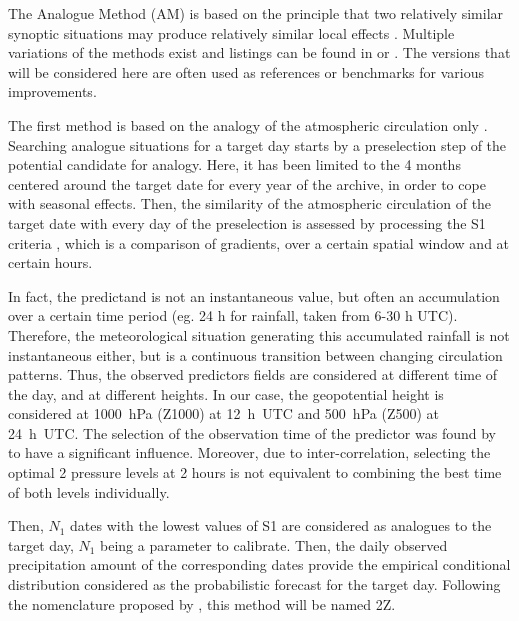 \documentclass[hess]{copernicus}
\begin{document}
\introduction  %

The Analogue Method (AM) is based on the principle that two relatively similar synoptic situations may produce relatively similar local effects \citep{Lorenz1956, Lorenz1969}. Multiple variations of the methods exist and listings can be found in \citet{Horton2016} or \citet{BenDaoud2015}. The versions that will be considered here are often used as references or benchmarks for various improvements.

The first method is based on the analogy of the atmospheric circulation only \citep[Table \ref{table:method_2Z},][]{Obled2002, Bontron2005, Marty2012}. Searching analogue situations for a target day starts by a preselection step of the potential candidate for analogy. Here, it has been limited to the 4 months centered around the target date for every year of the archive, in order to cope with seasonal effects. Then, the similarity of the atmospheric circulation of the target date with every day of the preselection is assessed by processing the S1 criteria \citep[Eq.\ \ref{eq:S1}, ][]{Teweles1954, Drosdowsky2003}, which is a comparison of gradients, over a certain spatial window and at certain hours.

In fact, the predictand is not an instantaneous value, but often an accumulation over a certain time period (eg. 24 h for rainfall, taken from 6-30 h UTC). Therefore, the meteorological situation generating this accumulated rainfall is not instantaneous either, but is a continuous transition between changing circulation patterns. Thus, the observed predictors fields are considered at different time of the day, and at different heights. In our case, the geopotential height is considered at 1000~hPa (Z1000) at 12~h~UTC and 500~hPa (Z500) at 24~h~UTC. The selection of the observation time of the predictor was found by \citet{Bontron2004} to have a significant influence. Moreover, due to inter-correlation, selecting the optimal 2 pressure levels at 2 hours is not equivalent to combining the best time of both levels individually.

Then, $N_{1}$ dates with the lowest values of S1 are considered as analogues to the target day, $N_{1}$ being a parameter to calibrate. Then, the daily observed precipitation amount of the corresponding dates provide the empirical conditional distribution considered as the probabilistic forecast for the target day. Following the nomenclature proposed by \citet{Horton2016}, this method will be named 2Z.
\end{document}

